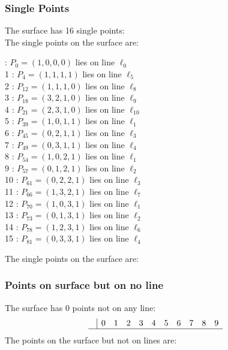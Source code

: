 \documentclass{article}
\begin{document}
{\subsubsection*{Single Points}
The surface has 16 single points:\\
The single points on the surface are:\\
\begin{multicols}{2}
 : $P_{0}=( 1, 0, 0, 0 )$ lies on line $\ell_{0}$\\
1 : $P_{4}=( 1, 1, 1, 1 )$ lies on line $\ell_{5}$\\
2 : $P_{12}=( 1, 1, 1, 0 )$ lies on line $\ell_{8}$\\
3 : $P_{18}=( 3, 2, 1, 0 )$ lies on line $\ell_{9}$\\
4 : $P_{21}=( 2, 3, 1, 0 )$ lies on line $\ell_{10}$\\
5 : $P_{39}=( 1, 0, 1, 1 )$ lies on line $\ell_{1}$\\
6 : $P_{45}=( 0, 2, 1, 1 )$ lies on line $\ell_{3}$\\
7 : $P_{49}=( 0, 3, 1, 1 )$ lies on line $\ell_{4}$\\
8 : $P_{54}=( 1, 0, 2, 1 )$ lies on line $\ell_{1}$\\
9 : $P_{57}=( 0, 1, 2, 1 )$ lies on line $\ell_{2}$\\
10 : $P_{61}=( 0, 2, 2, 1 )$ lies on line $\ell_{3}$\\
11 : $P_{66}=( 1, 3, 2, 1 )$ lies on line $\ell_{7}$\\
12 : $P_{70}=( 1, 0, 3, 1 )$ lies on line $\ell_{1}$\\
13 : $P_{73}=( 0, 1, 3, 1 )$ lies on line $\ell_{2}$\\
14 : $P_{78}=( 1, 2, 3, 1 )$ lies on line $\ell_{6}$\\
15 : $P_{81}=( 0, 3, 3, 1 )$ lies on line $\ell_{4}$\\
\end{multicols}
The single points on the surface are:\\
\subsubsection*{Points on surface but on no line}
The surface has 0 points not on any line:\\
$$
\begin{array}{r|*{10}{r}}
 & 0 & 1 & 2 & 3 & 4 & 5 & 6 & 7 & 8 & 9\\
\hline
\end{array}
$$
The points on the surface but not on lines are:\\
\begin{multicols}{2}
\noindent
\end{multicols}
}
\end{document}
